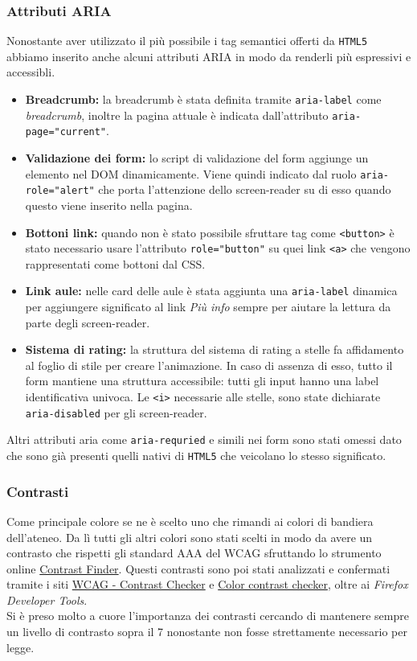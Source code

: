 \subsubsection{Attributi ARIA}
Nonostante aver utilizzato il più possibile i tag semantici offerti da \texttt{HTML5} abbiamo inserito anche alcuni attributi ARIA in modo da renderli più espressivi e accessibli.
\begin{itemize}
    \item \textbf{Breadcrumb:} la breadcrumb è stata definita tramite \texttt{aria-label} come \textit{breadcrumb}, inoltre la pagina attuale è indicata dall'attributo \texttt{aria-page="current"}.
    \item \textbf{Validazione dei form:} lo script di validazione del form aggiunge un elemento nel DOM dinamicamente. Viene quindi indicato dal ruolo \texttt{aria-role="alert"} che porta l'attenzione dello screen-reader su di esso quando questo viene inserito nella pagina.
    \item \textbf{Bottoni link:} quando non è stato possibile sfruttare tag come \texttt{<button>} è stato necessario usare l'attributo \texttt{role="button"} su quei link \texttt{<a>} che vengono rappresentati come bottoni dal CSS.
    \item \textbf{Link aule:} nelle card delle aule è stata aggiunta una \texttt{aria-label} dinamica per aggiungere significato al link \textit{Più info} sempre per aiutare la lettura da parte degli screen-reader.
    \item \textbf{Sistema di rating:} la struttura del sistema di rating a stelle fa affidamento al foglio di stile per creare l'animazione. In caso di assenza di esso, tutto il form mantiene una struttura accessibile: tutti gli input hanno una label identificativa univoca. Le \texttt{<i>} necessarie alle stelle, sono state dichiarate \texttt{aria-disabled} per gli screen-reader.
\end{itemize}
Altri attributi aria come \texttt{aria-requried} e simili nei form sono stati omessi dato che sono già presenti quelli nativi di \texttt{HTML5} che veicolano lo stesso significato.

\subsubsection{Contrasti}
Come principale colore se ne è scelto uno che rimandi ai colori di bandiera dell'ateneo. Da lì tutti gli altri colori sono stati scelti in modo da avere un contrasto che rispetti gli standard AAA del WCAG sfruttando lo strumento online \href{https://app.contrast-finder.org/}{Contrast Finder}. Questi contrasti sono poi stati analizzati e confermati tramite i siti \href{https://contrastchecker.com/}{WCAG - Contrast Checker} e \href{https://coolors.co/}{Color contrast checker}, oltre ai \textit{Firefox Developer Tools}.\\
Si è preso molto a cuore l'importanza dei contrasti cercando di mantenere sempre un livello di contrasto sopra il 7 nonostante non fosse strettamente necessario per legge.


